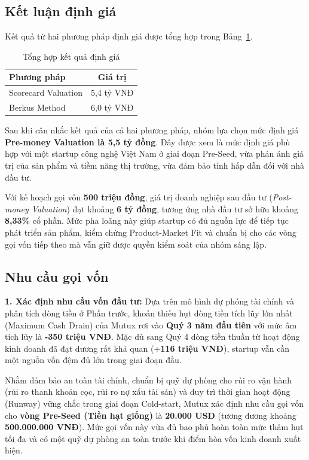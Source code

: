 \subsection{Kết luận định giá}

Kết quả từ hai phương pháp định giá được tổng hợp trong Bảng~\ref{tab:valuation}.

\begin{table}[H]
\centering
\caption{Tổng hợp kết quả định giá}
\label{tab:valuation}
\begin{tabular}{lc}
\toprule
\textbf{Phương pháp} & \textbf{Giá trị} \\
\midrule
Scorecard Valuation & 5,4 tỷ VNĐ \\
Berkus Method & 6,0 tỷ VNĐ \\
\bottomrule
\end{tabular}
\end{table}

Sau khi cân nhắc kết quả của cả hai phương pháp, nhóm lựa chọn mức định giá \textbf{Pre-money Valuation là 5,5 tỷ đồng}. Đây được xem là mức định giá phù hợp với một startup công nghệ Việt Nam ở giai đoạn Pre-Seed, vừa phản ánh giá trị của sản phẩm và tiềm năng thị trường, vừa đảm bảo tính hấp dẫn đối với nhà đầu tư.

Với kế hoạch gọi vốn \textbf{500 triệu đồng}, giá trị doanh nghiệp sau đầu tư (\textit{Post-money Valuation}) đạt khoảng \textbf{6 tỷ đồng}, tương ứng nhà đầu tư sở hữu khoảng \textbf{8,33\%} cổ phần. Mức pha loãng này giúp startup có đủ nguồn lực để tiếp tục phát triển sản phẩm, kiểm chứng Product-Market Fit và chuẩn bị cho các vòng gọi vốn tiếp theo mà vẫn giữ được quyền kiểm soát của nhóm sáng lập.

\subsection{Nhu cầu gọi vốn}

\textbf{1. Xác định nhu cầu vốn đầu tư:}
Dựa trên mô hình dự phóng tài chính và phân tích dòng tiền ở Phần trước, khoản thiếu hụt dòng tiền tích lũy lớn nhất (Maximum Cash Drain) của Mutux rơi vào \textbf{Quý 3 năm đầu tiên} với mức âm tích lũy là \textbf{-350 triệu VNĐ}. Mặc dù sang Quý 4 dòng tiền thuần từ hoạt động kinh doanh đã đạt dương rất khả quan (+\textbf{116 triệu VNĐ}), startup vẫn cần một nguồn vốn đệm đủ lớn trong giai đoạn đầu.

Nhằm đảm bảo an toàn tài chính, chuẩn bị quỹ dự phòng cho rủi ro vận hành (rủi ro thanh khoản cọc, rủi ro nợ xấu tài sản) và duy trì thời gian hoạt động (Runway) vững chắc trong giai đoạn Cold-start, Mutux xác định nhu cầu gọi vốn cho \textbf{vòng Pre-Seed (Tiền hạt giống)} là \textbf{20.000 USD} (tương đương khoảng \textbf{500.000.000 VNĐ}). Mức gọi vốn này vừa đủ bao phủ hoàn toàn mức thâm hụt tối đa và có một quỹ dự phòng an toàn trước khi điểm hòa vốn kinh doanh xuất hiện.


